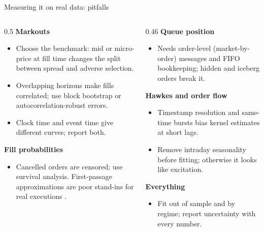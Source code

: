 \begin{frame}{Measuring it on real data: pitfalls}
  \small
  \begin{columns}[T]
    \begin{column}{0.5\textwidth}
      \textbf{Markouts}
      \begin{itemize}
        \item Choose the benchmark: mid or micro-price at fill time changes the split between spread and adverse selection.
        \item Overlapping horizons make fills correlated; use block bootstrap or autocorrelation-robust errors.
        \item Clock time and event time give different curves; report both.
      \end{itemize}
      \textbf{Fill probabilities}
      \begin{itemize}
        \item Cancelled orders are censored; use survival analysis. First-passage approximations are poor stand-ins for real executions \citep{lo2002econometric}.
      \end{itemize}
    \end{column}
    \begin{column}{0.46\textwidth}
      \textbf{Queue position}
      \begin{itemize}
        \item Needs order-level (market-by-order) messages and FIFO bookkeeping; hidden and iceberg orders break it.
      \end{itemize}
      \textbf{Hawkes and order flow}
      \begin{itemize}
        \item Timestamp resolution and same-time bursts bias kernel estimates at short lags.
        \item Remove intraday seasonality before fitting; otherwise it looks like excitation.
      \end{itemize}
      \textbf{Everything}
      \begin{itemize}
        \item Fit out of sample and by regime; report uncertainty with every number.
      \end{itemize}
    \end{column}
  \end{columns}
\end{frame}

